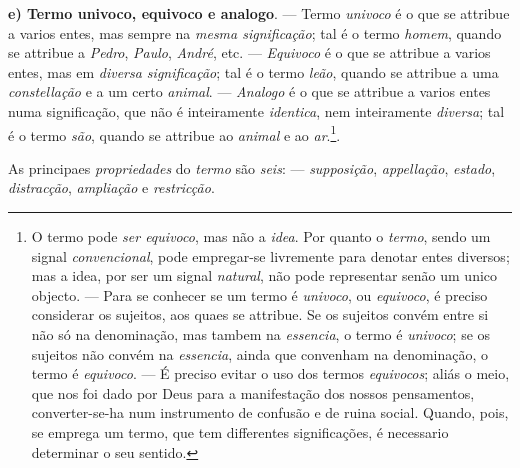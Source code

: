 \textbf{e) Termo univoco, equivoco e analogo}. --- Termo \emph{univoco} é o que se attribue a varios entes, mas sempre na \emph{mesma significação}; tal é o termo \emph{homem}, quando se attribue a \emph{Pedro}, \emph{Paulo}, \emph{André}, etc. --- \emph{Equivoco} é o que se attribue a varios entes, mas em \emph{diversa significação}; tal é o termo \emph{leão}, quando se attribue a uma \emph{constellação} e a um certo \emph{animal}. --- \emph{Analogo} é o que se attribue a varios entes numa significação, que não é inteiramente \emph{identica}, nem inteiramente \emph{diversa}; tal é o termo \emph{são}, quando se attribue ao \emph{animal} e ao \emph{ar}.\footnote{O termo pode \emph{ser equivoco}, mas não a \emph{idea}. Por quanto o \emph{termo}, sendo um signal \emph{convencional}, pode empregar-se livremente para denotar entes diversos; mas a idea, por ser um signal \emph{natural}, não pode representar senão um unico objecto. --- Para se conhecer se um termo é \emph{univoco}, ou \emph{equivoco}, é preciso considerar os sujeitos, aos quaes se attribue. Se os sujeitos convém entre si não só na denominação, mas tambem na \emph{essencia}, o termo é \emph{univoco}; se os sujeitos não convém na \emph{essencia}, ainda que convenham na denominação, o termo é \emph{equivoco}. --- É preciso evitar o uso dos termos \emph{equivocos}; aliás o meio, que nos foi dado por Deus para a manifestação dos nossos pensamentos, converter-se-ha num instrumento de confusão e de ruina social. Quando, pois, se emprega um termo, que tem differentes significações, é necessario determinar o seu sentido.}.


  
As principaes \emph{propriedades} do \emph{termo} são \emph{seis}: --- \emph{supposição}, \emph{appellação}, \emph{estado}, \emph{distracção}, \emph{ampliação} e \emph{restricção}.

